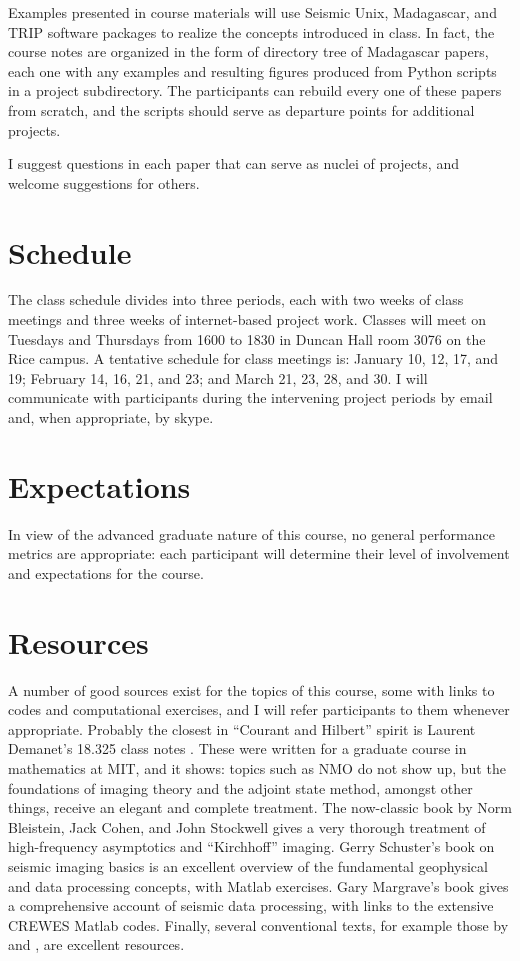 Examples presented in course materials will use Seismic Unix, Madagascar, and TRIP software packages to realize the concepts introduced in class. In fact, the course notes are organized in the form of directory tree of Madagascar papers, each one with any examples and resulting figures produced from Python scripts in a project subdirectory. The participants can rebuild every one of these papers from scratch, and the scripts should serve as departure points for additional projects.

I suggest questions in each paper that can serve as nuclei of projects, and welcome suggestions for others.

\section{Schedule}
The class schedule divides into three periods, each with two weeks of class meetings and three weeks of internet-based project work. Classes will meet on Tuesdays and Thursdays from 1600 to 1830 in Duncan Hall room 3076 on the Rice campus. A tentative schedule for class meetings is: January 10, 12, 17, and 19; February 14, 16, 21, and 23; and March 21, 23, 28, and 30. I will communicate with participants during the intervening project periods by email and, when appropriate, by skype.

\section{Expectations}
In view of the advanced graduate nature of this course, no general performance metrics are appropriate: each participant will determine their level of involvement and expectations for the course.

\section{Resources}
A number of good sources exist for the topics of this course, some with links to codes and computational exercises, and I will refer participants to them whenever appropriate. Probably the closest in ``Courant and Hilbert'' spirit is Laurent Demanet's 18.325 class notes \cite[]{Demanet:325notes}. These were written for a graduate course in mathematics at MIT, and it shows: topics such as NMO do not show up, but the foundations of imaging theory and the adjoint state method, amongst other things, receive an elegant and complete treatment. The now-classic book by Norm Bleistein, Jack Cohen, and John Stockwell \cite[]{BleisteinCohenStockwell:01} gives a very thorough treatment of high-frequency asymptotics and ``Kirchhoff'' imaging.  Gerry Schuster's book on seismic imaging basics \cite[]{Schuster:10} is an excellent overview of the fundamental geophysical and data processing concepts, with Matlab exercises. Gary Margrave's book \cite[]{Margrave:book} gives a comprehensive account of seismic data processing, with links to the extensive CREWES Matlab codes. Finally, several conventional texts, for example those by \cite{Yil:01} and \cite{DobSav:88}, are excellent resources. 


